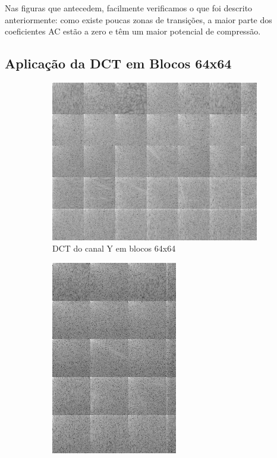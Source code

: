 \documentclass[a4paper, 12pt]{article}
\begin{document}
        Nas figuras que antecedem, facilmente verificamos o que foi descrito anteriormente:
        como existe poucas zonas de transições, a maior parte dos coeficientes AC estão a zero e têm um 
        maior potencial de compressão.

        \subsection{Aplicação da DCT em Blocos 64x64}
        \begin{figure}[H]
            \begin{subfigure}{0.3\textwidth}
                \centering
                \includegraphics[scale=0.5]{resources/DCT/Ydct64.png}
                \caption{ DCT do canal Y em blocos 64x64}
            \end{subfigure}
            \hfill
            \begin{subfigure}{0.3\textwidth}
                \centering 
                \includegraphics[scale=0.5]{resources/DCT/CBdct64.png}

\end{subfigure}
\end{figure}
\end{document}
